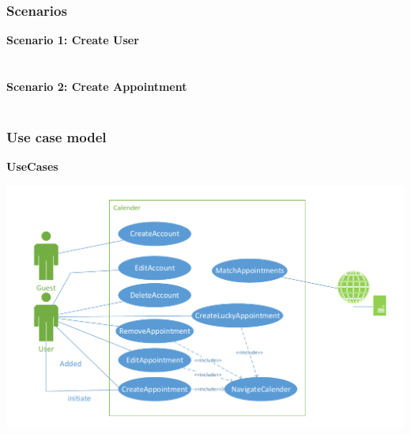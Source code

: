 \subsubsection{Scenarios}
\textbf{Scenario 1: Create User} \\
	\\\\
\textbf{Scenario 2: Create Appointment} \\
	\\

\pagebreak
\subsubsection{Use case model}
\textbf{UseCases} \\
	
	\begin{center}	
	\includegraphics[scale=0.62]{sections/3_04_system_models/UseCaseDiagram.pdf}\\
		\\[1in]
		\\[1in]
		\\
		\\[1in]
		\\
		\\[1in]
		\\
	\end{center}
	
